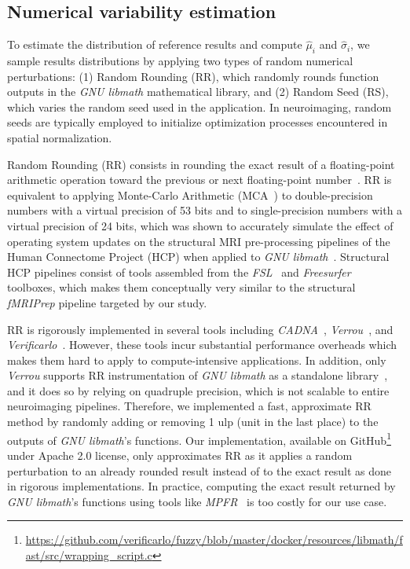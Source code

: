 \documentclass[lettersize,journal]{IEEEtran}
\newcommand{\fmriprep}{\emph{fMRIPrep}\xspace}
\begin{document}
{\subsection{Numerical variability estimation}  %
\label{subsec:numerical_variablity_model}

To estimate the distribution of reference results and compute $\hat \mu_i$ and $\hat \sigma_i$, we sample results distributions by applying two types of random numerical perturbations: (1) Random Rounding (RR), which randomly rounds function outputs in the \emph{GNU libmath} mathematical library, and (2) Random Seed (RS), which varies the random seed used in the application. In neuroimaging, random seeds are typically employed to initialize optimization processes encountered in spatial normalization.

Random Rounding (RR) consists in rounding the exact result of a floating-point arithmetic operation toward the previous or next floating-point number~\cite{forsythe1959reprint}. RR is equivalent to applying Monte-Carlo Arithmetic (MCA~\cite{parker1997monte}) to double-precision numbers with a virtual precision of 53 bits and to single-precision numbers with a virtual precision of 24 bits, which was shown to accurately simulate the effect of operating system updates on the structural MRI pre-processing pipelines of the Human Connectome Project (HCP) when applied to \emph{GNU libmath}~\cite{salari2021accurate}. Structural HCP pipelines consist of tools assembled from the \emph{FSL}~\cite{jenkinson2012fsl} and \emph{Freesurfer}~\cite{fischl2012freesurfer} toolboxes, which makes them conceptually very similar to the structural \fmriprep pipeline targeted by our study.

RR is rigorously implemented in several tools including \emph{CADNA}~\cite{jezequel2008cadna}, \emph{Verrou}~\cite{fevotte2016verrou}, and \emph{Verificarlo}~\cite{denis2016verificarlo}.
However, these tools incur substantial performance overheads which makes them hard to apply to compute-intensive applications. In addition, only \emph{Verrou} supports RR instrumentation of \emph{GNU libmath} as a standalone library~\cite{fevotte2019debugging}, and it does so by relying on quadruple precision, which is not scalable to entire neuroimaging pipelines.
Therefore, we implemented a fast, approximate RR method by randomly adding or removing 1 ulp (unit in the last place) to the outputs of \emph{GNU libmath}'s functions.
Our implementation, available on GitHub\footnote{\url{https://github.com/verificarlo/fuzzy/blob/master/docker/resources/libmath/fast/src/wrapping\_script.c}} under Apache 2.0 license,  only approximates RR as it applies a random perturbation to an already rounded result instead of to the exact result as done in rigorous implementations.
In practice, computing the exact result returned by \emph{GNU libmath}'s functions using tools like \emph{MPFR}~\cite{fousse2007mpfr} is too costly for our use case.

}
\end{document}
